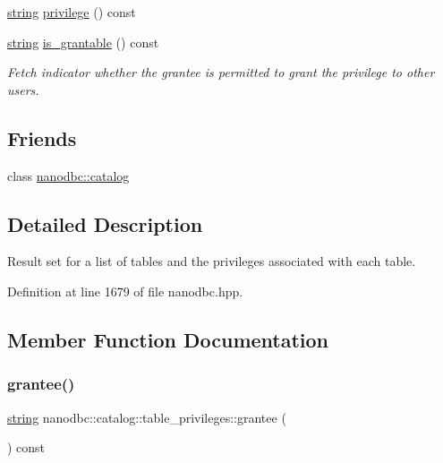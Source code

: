 \begin{DoxyCompactItemize}
\mbox{\hyperlink{namespacenanodbc_abfc0ece56278e590911ec8352774c212}{string}} \mbox{\hyperlink{classnanodbc_1_1catalog_1_1table__privileges_a0a6b85672d5d8be8766a78c087f32d47}{privilege}} () const
\item 
\mbox{\hyperlink{namespacenanodbc_abfc0ece56278e590911ec8352774c212}{string}} \mbox{\hyperlink{classnanodbc_1_1catalog_1_1table__privileges_ae281289d9513f9af912d3de4a7e1f113}{is\+\_\+grantable}} () const
\begin{DoxyCompactList}\small\item\em Fetch indicator whether the grantee is permitted to grant the privilege to other users. \end{DoxyCompactList}\end{DoxyCompactItemize}
\subsection*{Friends}
\begin{DoxyCompactItemize}
\item 
class \mbox{\hyperlink{classnanodbc_1_1catalog_1_1table__privileges_af0f3134c7f6f1f36bfe1e247318dfe43}{nanodbc\+::catalog}}
\end{DoxyCompactItemize}


\subsection{Detailed Description}
Result set for a list of tables and the privileges associated with each table. 

Definition at line 1679 of file nanodbc.\+hpp.



\subsection{Member Function Documentation}
\mbox{\label{classnanodbc_1_1catalog_1_1table__privileges_ab14ef42b52e2694e836d01105224d815}} 
\subsubsection{\texorpdfstring{grantee()}{grantee()}}
{\footnotesize\ttfamily \mbox{\hyperlink{namespacenanodbc_abfc0ece56278e590911ec8352774c212}{string}} nanodbc\+::catalog\+::table\+\_\+privileges\+::grantee (\begin{DoxyParamCaption}{ }\end{DoxyParamCaption}) const}



